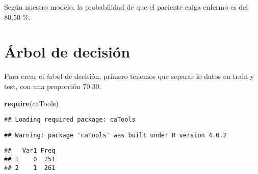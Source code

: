 \documentclass[
]{article}
\newenvironment{Shaded}{\begin{snugshade}}{\end{snugshade}}
\newcommand{\CommentTok}[1]{\textcolor[rgb]{0.56,0.35,0.01}{\textit{#1}}}
\newcommand{\DataTypeTok}[1]{\textcolor[rgb]{0.13,0.29,0.53}{#1}}
\newcommand{\DecValTok}[1]{\textcolor[rgb]{0.00,0.00,0.81}{#1}}
\newcommand{\FloatTok}[1]{\textcolor[rgb]{0.00,0.00,0.81}{#1}}
\newcommand{\KeywordTok}[1]{\textcolor[rgb]{0.13,0.29,0.53}{\textbf{#1}}}
\newcommand{\NormalTok}[1]{#1}
\newcommand{\OperatorTok}[1]{\textcolor[rgb]{0.81,0.36,0.00}{\textbf{#1}}}
\newcommand{\OtherTok}[1]{\textcolor[rgb]{0.56,0.35,0.01}{#1}}
\newcommand{\StringTok}[1]{\textcolor[rgb]{0.31,0.60,0.02}{#1}}
\begin{document}
Según nuestro modelo, la probabilidad de que el paciente caiga enfermo
es del 80,50 \%.

\hypertarget{uxe1rbol-de-decisiuxf3n}{%
\section{Árbol de decisión}\label{uxe1rbol-de-decisiuxf3n}}

Para crear el árbol de decisión, primero tenemos que separar lo datos en
train y test, con una proporción 70:30.

\begin{Shaded}
\begin{Highlighting}[]
\KeywordTok{require}\NormalTok{(caTools)}
\end{Highlighting}
\end{Shaded}

\begin{verbatim}
## Loading required package: caTools
\end{verbatim}

\begin{verbatim}
## Warning: package 'caTools' was built under R version 4.0.2
\end{verbatim}

\begin{Shaded}
\end{Shaded}

\begin{verbatim}
##   Var1 Freq
## 1    0  251
## 2    1  261
\end{verbatim}
\end{document}
